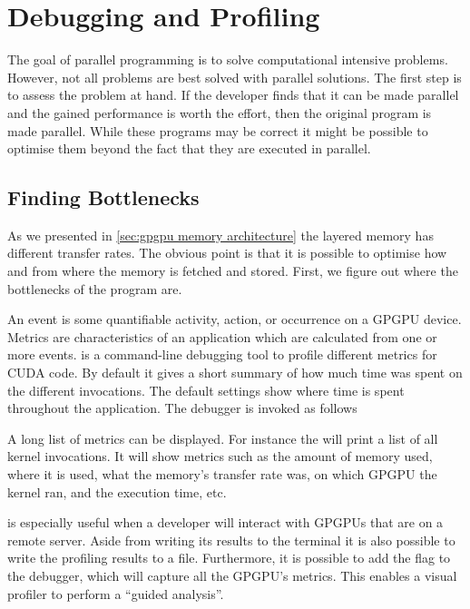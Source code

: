 \section{Debugging and Profiling}
\label{sec:debugging and profiling}

The goal of parallel programming is to solve computational intensive problems.
However, not all problems are best solved with parallel solutions.
The first step is to assess the problem at hand.
If the developer finds that it can be made parallel and the gained performance is worth the effort, then the original program is made parallel.
While these programs may be correct it might be possible to optimise them beyond the fact that they are executed in parallel.~\cite{nvidia2015doc}

\subsection{Finding Bottlenecks}
\label{sec:finding bottlenecks}

As we presented in \cref{sec:gpgpu memory architecture} the layered memory has different transfer rates.
The obvious point is that it is possible to optimise how and from where the memory is fetched and stored.
First, we figure out where the bottlenecks of the program are.~\cite{farber2011cuda}

An event is some quantifiable activity, action, or occurrence on a GPGPU device.
Metrics are characteristics of an application which are calculated from one or more events.
 is a command-line debugging tool to profile different metrics for CUDA code.
By default it gives a short summary of how much time was spent on the different invocations.
The default settings show where time is spent throughout the application.
The debugger is invoked as follows
%
\begin{quote}
\end{quote}
%
A long list of metrics can be displayed.
For instance the  will print a list of all kernel invocations.
It will show metrics such as the amount of memory used, where it is used, what the memory's transfer rate was, on which GPGPU the kernel ran, and the execution time, etc.~\cite{profiling2015doc}

 is especially useful when a developer will interact with GPGPUs that are on a remote server.
Aside from writing its results to the terminal it is also possible to write the profiling results to a file.
Furthermore, it is possible to add the  flag to the debugger, which will capture all the GPGPU's metrics.
This enables a visual profiler to perform a ``guided analysis''.~\cite{nvprof2013tips}

